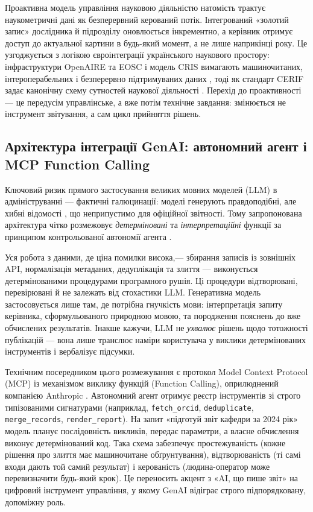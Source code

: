Проактивна модель управління науковою діяльністю натомість трактує наукометричні дані як безперервний керований потік. Інтегрований «золотий запис» дослідника й підрозділу оновлюється інкрементно, а керівник отримує доступ до актуальної картини в будь-який момент, а не лише наприкінці року. Це узгоджується з логікою євроінтеграції українського наукового простору: інфраструктури OpenAIRE та EOSC і модель CRIS вимагають машиночитаних, інтероперабельних і безперервно підтримуваних даних \cite{OpenAIRE2023GuidelinesCRIS,Bryant2017RIMDefining}, тоді як стандарт CERIF задає канонічну схему сутностей наукової діяльності \cite{euroCRIS2024CERIF}. Перехід до проактивності — це передусім управлінське, а вже потім технічне завдання: змінюється не інструмент звітування, а сам цикл прийняття рішень.

\subsection*{Архітектура інтеграції GenAI: автономний агент і MCP Function Calling}

Ключовий ризик прямого застосування великих мовних моделей (LLM) в адмініструванні — фактичні галюцинації: моделі генерують правдоподібні, але хибні відомості \cite{Chelli2024HallucinationRates}, що неприпустимо для офіційної звітності. Тому запропонована архітектура чітко розмежовує \emph{детерміновані} та \emph{інтерпретаційні} функції за принципом контрольованої автономії агента \cite{Wang2024SurveyLLMAgents}.

Уся робота з даними, де ціна помилки висока,— збирання записів із зовнішніх API, нормалізація метаданих, дедуплікація та злиття — виконується детермінованими процедурами програмного рушія. Ці процедури відтворювані, перевірювані й не залежать від стохастики LLM. Генеративна модель застосовується лише там, де потрібна гнучкість мови: інтерпретація запиту керівника, сформульованого природною мовою, та породження пояснень до вже обчислених результатів. Інакше кажучи, LLM не \emph{ухвалює} рішень щодо тотожності публікацій — вона лише транслює наміри користувача у виклики детермінованих інструментів і вербалізує підсумки.

Технічним посередником цього розмежування є протокол Model Context Protocol (MCP) із механізмом виклику функцій (Function Calling), оприлюднений компанією Anthropic \cite{Anthropic2024MCP}. Автономний агент отримує реєстр інструментів зі строго типізованими сигнатурами (наприклад, \texttt{fetch\_orcid}, \texttt{deduplicate}, \texttt{merge\_records}, \texttt{render\_report}). На запит «підготуй звіт кафедри за 2024 рік» модель планує послідовність викликів, передає параметри, а власне обчислення виконує детермінований код. Така схема забезпечує простежуваність (кожне рішення про злиття має машиночитане обґрунтування), відтворюваність (ті самі входи дають той самий результат) і керованість (людина-оператор може перевизначити будь-який крок). Це переносить акцент з «AI, що пише звіт» на цифровий інструмент управління, у якому GenAI відіграє строго підпорядковану, допоміжну роль.

